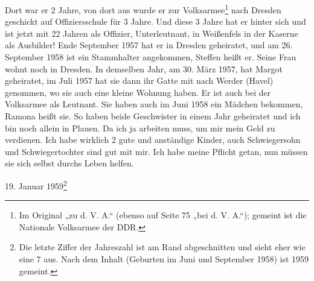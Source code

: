 \documentclass[a5paper,11pt,openany]{book}
\newcommand{\seite}[1]{\leavevmode\marginpar{\footnotesize\itshape\raggedright #1}\ignorespaces}
\begin{document}
Dort war er 2 Jahre,
\seite{74}
von dort aus wurde er zur Volksarmee\footnote{Im Original „zu d. V. A.“ (ebenso auf Seite 75 „bei d. V. A.“); gemeint ist die Nationale Volksarmee der DDR.} nach Dresden geschickt auf Offiziersschule für 3 Jahre.
Und diese 3 Jahre hat er hinter sich und ist jetzt mit 22 Jahren als Offizier,
  Unterleutnant, in Weißenfels in der Kaserne als Ausbilder!
Ende September 1957 hat er in Dresden geheiratet, und am 26. September 1958 ist ein Stammhalter angekommen,
  Steffen heißt er.
Seine Frau wohnt noch in Dresden.
In demselben Jahr, am 30. März 1957, hat Margot geheiratet, im Juli 1957 hat sie dann ihr Gatte mit nach
\seite{75}
Werder (Havel) genommen, wo sie auch eine kleine Wohnung haben.
Er ist auch bei der Volksarmee als Leutnant.
Sie haben auch im Juni 1958 ein Mädchen bekommen, Ramona heißt sie.
So haben beide Geschwister in einem Jahr geheiratet und ich bin noch allein in Plauen.
Da ich ja arbeiten muss, um mir mein Geld zu verdienen.
Ich habe wirklich 2 gute und anständige Kinder, auch Schwiegersohn und Schwiegertochter sind gut mit mir.
Ich habe meine Pflicht getan, nun müssen sie sich selbst durchs Leben helfen.
\par\medskip\hfill 19. Januar 1959\footnote{Die letzte Ziffer der Jahreszahl ist am Rand abgeschnitten und sieht eher wie eine 7 aus. Nach dem Inhalt (Geburten im Juni und September 1958) ist 1959 gemeint.}
\end{document}

